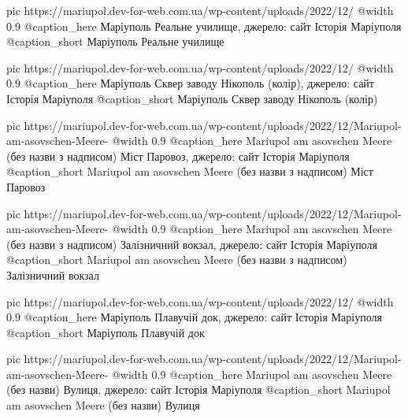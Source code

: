 	pic https://mariupol.dev-for-web.com.ua/wp-content/uploads/2022/12/%
	@width 0.9
	@caption_here Маріуполь Реальне училище, джерело: сайт Історія Маріуполя
	@caption_short Маріуполь Реальне училище

	pic https://mariupol.dev-for-web.com.ua/wp-content/uploads/2022/12/%
	@width 0.9
	@caption_here Маріуполь Сквер заводу Нікополь (колір), джерело: сайт Історія Маріуполя
	@caption_short Маріуполь Сквер заводу Нікополь (колір)

	pic https://mariupol.dev-for-web.com.ua/wp-content/uploads/2022/12/Mariupol-am-asovschen-Meere-%
	@width 0.9
	@caption_here Mariupol am asovschen Meere (без назви з надписом) Міст Паровоз, джерело: сайт Історія Маріуполя
	@caption_short Mariupol am asovschen Meere (без назви з надписом) Міст Паровоз

	pic https://mariupol.dev-for-web.com.ua/wp-content/uploads/2022/12/Mariupol-am-asovschen-Meere-%
	@width 0.9
	@caption_here Mariupol am asovschen Meere (без назви з надписом) Залізничний вокзал, джерело: сайт Історія Маріуполя
	@caption_short Mariupol am asovschen Meere (без назви з надписом) Залізничний вокзал

	pic https://mariupol.dev-for-web.com.ua/wp-content/uploads/2022/12/%
	@width 0.9
	@caption_here Маріуполь Плавучій док, джерело: сайт Історія Маріуполя
	@caption_short Маріуполь Плавучій док

	pic https://mariupol.dev-for-web.com.ua/wp-content/uploads/2022/12/Mariupol-am-asovschen-Meere-%
	@width 0.9
	@caption_here Mariupol am asovschen Meere (без назви) Вулиця, джерело: сайт Історія Маріуполя
	@caption_short Mariupol am asovschen Meere (без назви) Вулиця


